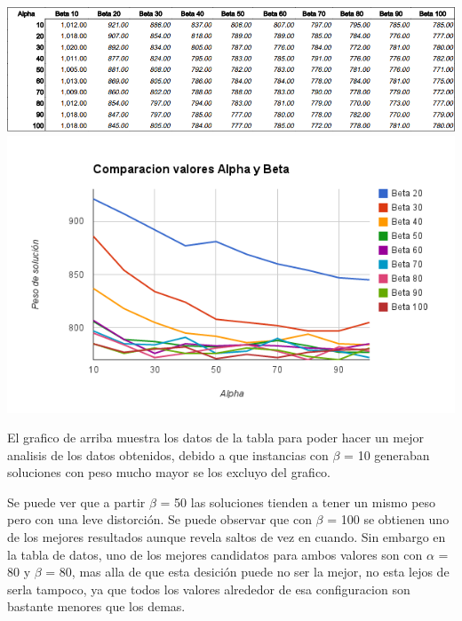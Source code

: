 \documentclass[10pt,a4paper]{article}
\begin{document}
\bigskip
\noindent \includegraphics[scale=0.55]{img/values.png} \\
\bigskip
\noindent \includegraphics[scale=0.75]{img/grafico_alpha_beta.png} 

El grafico de arriba muestra los datos de la tabla para poder hacer un mejor analisis de los datos obtenidos, debido a que instancias con $\beta$ = 10 generaban soluciones con peso mucho mayor se los excluyo del grafico.

Se puede ver que a partir $\beta$ = 50 las soluciones tienden a tener un mismo peso pero con una leve distorción. Se puede observar que con $\beta$ = 100 se obtienen uno de los mejores resultados aunque revela saltos de vez en cuando. Sin embargo en la tabla de datos, uno de los mejores candidatos para ambos valores son con $\alpha$ = 80 y $\beta$ = 80, mas alla de que esta desición puede no ser la mejor, no esta lejos de serla tampoco, ya que todos los valores alrededor de esa configuracion son bastante menores que los demas.
\end{document}

